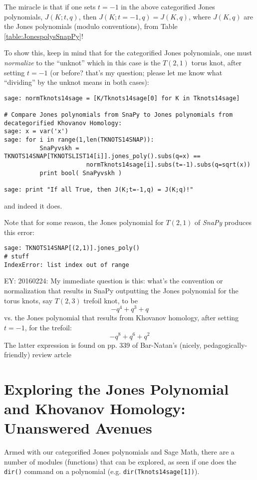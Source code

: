 \documentclass[10pt]{amsart}
\begin{document}
\begin{multicols}{2}

The miracle is that if one sets $t=-1$ in the above categorified Jones polynomials, $J(K;t,q)$, then $J(K;t=-1,q) = J(K,q)$, where $J(K,q)$ are the Jones polynomials (modulo conventions), from Table \ref{table:JonespolysSnapPy}!

To show this, keep in mind that for the categorified Jones polynomials, one must \emph{normalize} to the ``unknot'' which in this case is the $T(2,1)$ torus knot, after setting $t=-1$ (or before? that's my question; please let me know what ``dividing'' by the unknot means in both cases):
\begin{lstlisting}
sage: normTknots14sage = [K/Tknots14sage[0] for K in Tknots14sage]

# Compare Jones polynomials from SnaPy to Jones polynomials from decategorified Khovanov Homology:
sage: x = var('x')
sage: for i in range(1,len(TKNOTS14SNAP)):
          SnaPyvskh = TKNOTS14SNAP[TKNOTSLIST14[i]].jones_poly().subs(q=x) == 
                       normTknots14sage[i].subs(t=-1).subs(q=sqrt(x))
          print bool( SnaPyvskh )

sage: print "If all True, then J(K;t=-1,q) = J(K;q)!"
\end{lstlisting}  
and indeed it does.  

Note that for some reason, the Jones polynomial for $T(2,1)$ of \emph{SnaPy} produces this error: 
\begin{lstlisting}
sage: TKNOTS14SNAP[(2,1)].jones_poly()
# stuff
IndexError: list index out of range
\end{lstlisting}

EY: 20160224: My immediate question is this: what's the convention or normalization that results in SnaPy outputting the Jones polynomial for the torus knots, say $T(2,3)$ trefoil knot, to be
\[
-q^{4} + q^{3} + q
\]
vs. the Jones polynomial that results from Khovanov homology, after setting $t=-1$, for the trefoil:
\[
- q^{8} + q^{6} + q^{2}
\]
The latter expression is found on pp. 339 of Bar-Natan's (nicely, pedagogically-friendly) review artcle \cite{DBar-Natan2002}

\section{Exploring the Jones Polynomial and Khovanov Homology: Unanswered Avenues}

Armed with our categorified Jones polynomials and Sage Math, there are a number of modules (functions) that can be explored, as seen if one does the \verb|dir()| command on a polynomial (e.g. \verb|dir(Tknots14sage[1])|).  


\end{multicols}
\end{document}
